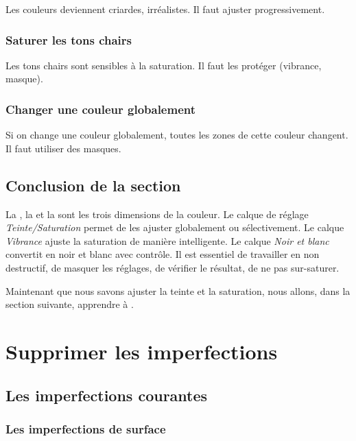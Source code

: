 Les couleurs deviennent criardes, irréalistes. Il faut ajuster progressivement.

\subsubsection{Saturer les tons chairs}

Les tons chairs sont sensibles à la saturation. Il faut les protéger (vibrance, masque).

\subsubsection{Changer une couleur globalement}

Si on change une couleur globalement, toutes les zones de cette couleur changent. Il faut utiliser des masques.

\subsection*{Conclusion de la section}

La , la  et la  sont les trois dimensions de la couleur. Le calque de réglage \emph{Teinte/Saturation} permet de les ajuster globalement ou sélectivement. Le calque \emph{Vibrance} ajuste la saturation de manière intelligente. Le calque \emph{Noir et blanc} convertit en noir et blanc avec contrôle. Il est essentiel de travailler en non destructif, de masquer les réglages, de vérifier le résultat, de ne pas sur-saturer.

Maintenant que nous savons ajuster la teinte et la saturation, nous allons, dans la section suivante, apprendre à .

\section{Supprimer les imperfections}

\subsection{Les imperfections courantes}

\subsubsection{Les imperfections de surface}

